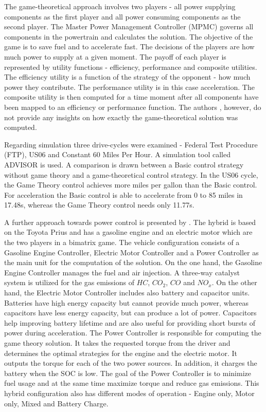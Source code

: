 The game-theoretical approach involves two players - all power supplying components as the first player and all power consuming components as the second player. The Master Power Management Controller (MPMC) governs all components in the powertrain and calculates the solution. The objective of the game is to save fuel and to accelerate fast. The decisions of the players are how much power to supply at a given moment. The payoff of each player is represented by utility functions - efficiency, performance and composite utilities. The efficiency utility is a function of the strategy of the opponent - how much power they contribute. The performance utility is in this case acceleration. The composite utility is then computed for a time moment after all components have been mapped to an efficiency or performance function. The authors \citet{gielniak2004power}, however, do not provide any insights on how exactly the game-theoretical solution was computed.

Regarding simulation three drive-cycles were examined - Federal Test Procedure (FTP), US06 and Constant 60 Miles Per Hour. A simulation tool called ADVISOR \citep{burch1999advisor} is used. A comparison is drawn between a Basic control strategy without game theory and a game-theoretical control strategy. In the US06 cycle, the Game Theory control achieves more miles per gallon than the Basic control. For acceleration the Basic control is able to accelerate from 0 to 85 miles in 17.48s, whereas the Game Theory control needs only 11.77s.


A further approach towards power control is presented by \citet{chin2010design}. The hybrid is based on the Toyota Prius and has a gasoline engine and an electric motor which are the two players in a bimatrix game. The vehicle configuration consists of a Gasoline Engine Controller, Electric Motor Controller and a Power Controller as the main unit for the computation of the solution. On the one hand, the Gasoline Engine Controller manages the fuel and air injection. A three-way catalyst system is utilized for the gas emissions of $HC$, $CO_2$, $CO$ and $NO_x$. On the other hand, the Electric Motor Controller includes also battery and capacitor units. Batteries have high energy capacity but cannot provide much power, whereas capacitors have less energy capacity, but can produce a lot of power. Capacitors help improving battery lifetime and are also useful for providing short bursts of power during acceleration. The Power Controller is responsible for computing the game theory solution. It takes the requested torque from the driver and determines the optimal strategies for the engine and the electric motor. It outputs the torque for each of the two power sources. In addition, it charges the battery when the SOC is low. The goal of the Power Controller is to minimize fuel usage and at the same time maximize torque and reduce gas emissions. This hybrid configuration also has different modes of operation - Engine only, Motor only, Mixed and Battery Charge.

